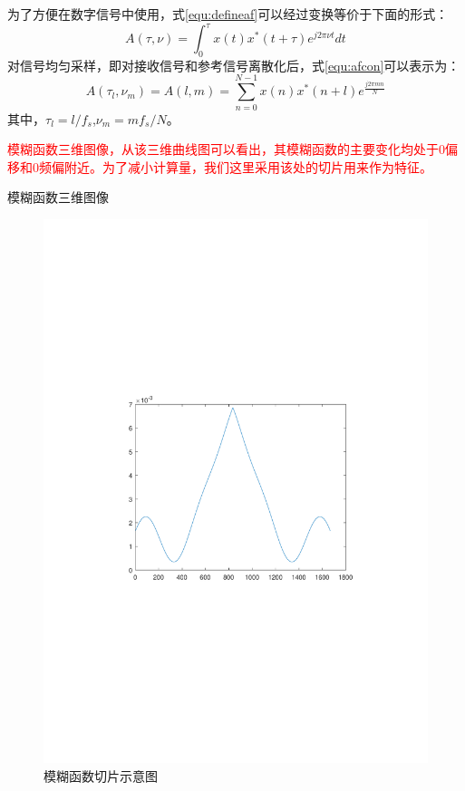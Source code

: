 为了方便在数字信号中使用，式\ref{equ:defineaf}可以经过变换等价于下面的形式：
\begin{equation}
A(\tau,\nu) = \int_{0}^{\tau}x(t)x^{*}(t+\tau)e^{j2\pi\nu t}dt
\label{equ:afcon}
\end{equation}
对信号均匀采样，即对接收信号和参考信号离散化后，式\ref{equ:afcon}可以表示为：
\begin{equation}
A(\tau_l,\nu_m) = A(l, m) = \sum_{n = 0}^{N-1}x(n)x^{*}(n+l)e^{\frac{j2\pi m n}{N}}	
\end{equation}
其中，$\tau_l=l/f_s$,$\nu_m=mf_s/N$。

\textcolor{red}{模糊函数三维图像，从该三维曲线图可以看出，其模糊函数的主要变化均处于0偏移和0频偏附近。为了减小计算量，我们这里采用该处的切片用来作为特征。
}

模糊函数三维图像

\begin{figure}
	\centering
	\includegraphics[width=\textwidth]{figures/af.pdf}
	\caption{模糊函数切片示意图}
\end{figure}

